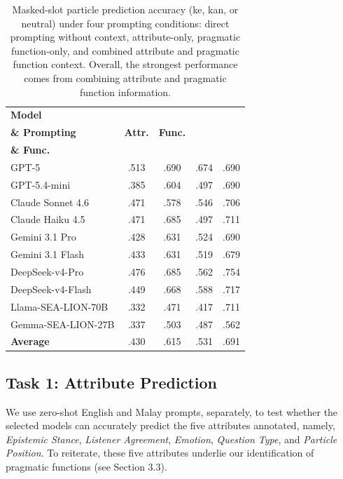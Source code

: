 \documentclass[11pt]{article}
\begin{document}
\begin{table}[t]
    \centering
    \footnotesize
    \renewcommand{\arraystretch}{1.15}
    \setlength{\tabcolsep}{1pt}

    \begin{tabular}{lcccc}
        \toprule
        \textbf{Model} &
        \shortstack{\textbf{Direct} \\ \textbf{\& Prompting}} &
        \textbf{Attr.} &
        \textbf{Func.} &
        \shortstack{\textbf{Attr.} \\ \textbf{\& Func.}} \\
        \midrule
        GPT-5 & .513 & .690 & .674 & .690 \\
        GPT-5.4-mini & .385 & .604 & .497 & .690 \\
        Claude Sonnet 4.6 & .471 & .578 & .546 & .706 \\
        Claude Haiku 4.5 & .471 & .685 & .497 & .711 \\
        Gemini 3.1 Pro & .428 & .631 & .524 & .690 \\
        Gemini 3.1 Flash & .433 & .631 & .519 & .679 \\
        DeepSeek-v4-Pro & .476 & .685 & .562 & .754 \\
        DeepSeek-v4-Flash & .449 & .668 & .588 & .717 \\
        \midrule
        Llama-SEA-LION-70B & .332 & .471 & .417 & .711 \\
        Gemma-SEA-LION-27B & .337 & .503 & .487 & .562 \\
        \midrule
        \textbf{Average} & .430 & .615 & .531 & .691 \\
        \bottomrule
    \end{tabular}

    \caption{Masked-slot particle prediction accuracy (ke, kan, or neutral) under four prompting conditions: direct prompting without context, attribute-only, pragmatic function-only, and combined attribute and pragmatic function context. Overall, the strongest performance comes from combining attribute and pragmatic function information.}
    \label{tab:task-2-generation-accuracy}
\end{table}


\subsection{Task 1: Attribute Prediction}
We use zero-shot English and Malay prompts, separately, to test whether the selected models can accurately predict the five attributes annotated, namely, \textit{Epistemic Stance}, \textit{Listener Agreement}, \textit{Emotion}, \textit{Question Type}, and \textit{Particle Position}. To reiterate, these five attributes underlie our identification of pragmatic functions (see Section 3.3). 
\end{document}
